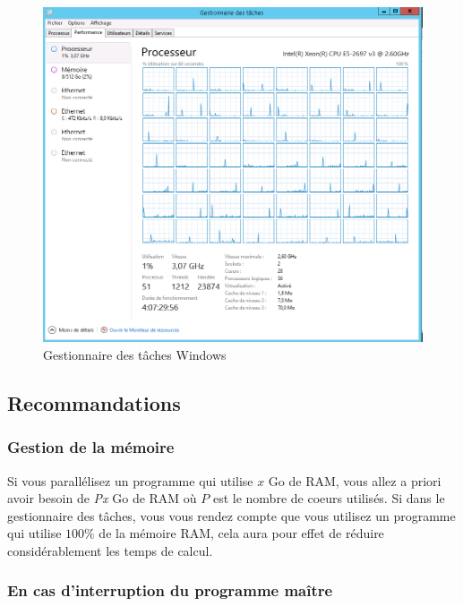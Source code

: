 \documentclass[
]{book}
\theoremstyle{definition}
\theoremstyle{definition}
\theoremstyle{definition}
\theoremstyle{definition}
\theoremstyle{remark}
\begin{document}
\begin{figure}
\centering
\includegraphics{Figures/processeur.png}
\caption{Gestionnaire des tâches Windows}
\end{figure}

\hypertarget{recommandations}{%
\subsection{Recommandations}\label{recommandations}}

\hypertarget{gestion-de-la-muxe9moire}{%
\subsubsection{Gestion de la mémoire}\label{gestion-de-la-muxe9moire}}

Si vous parallélisez un programme qui utilise \(x\) Go de RAM, vous allez a priori avoir besoin de \emph{Px} Go de RAM où \(P\) est le nombre de coeurs utilisés. Si dans le gestionnaire des tâches, vous vous rendez compte que vous utilisez un programme qui utilise \(100\%\) de la mémoire RAM, cela aura pour effet de réduire considérablement les temps de calcul.

\hypertarget{en-cas-dinterruption-du-programme-mauxeetre}{%
\subsubsection{En cas d'interruption du programme maître}\label{en-cas-dinterruption-du-programme-mauxeetre}}
\end{document}
